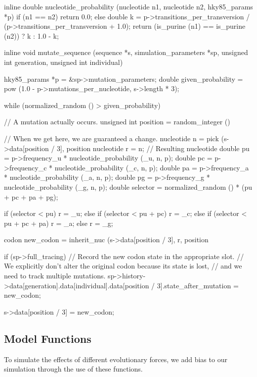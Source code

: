 \documentclass{article}
\begin{document}
\begin{ccode}
inline double nucleotide_probability (nucleotide n1, nucleotide n2, hky85_params *p) {
  if (n1 == n2)
    return 0.0;
  else {
    double k = p->transitions_per_transversion /
	       (p->transitions_per_transversion + 1.0);
    return (is_purine (n1) == is_purine (n2)) ? k : 1.0 - k;
  }
}

inline void mutate_sequence (sequence *s, simulation_parameters *sp,
			     unsigned int generation, unsigned int individual) {
  hky85_params *p = &sp->mutation_parameters;
  double given_probability = pow (1.0 - p->mutations_per_nucleotide, s->length * 3);

  while (normalized_random () > given_probability) {
    // A mutation actually occurs.
    unsigned int position = random_integer () %

    // When we get here, we are guaranteed a change.
    nucleotide n     = pick (s->data[position / 3], position %
    nucleotide r     = n; // Resulting nucleotide
    double pu        = p->frequency_u * nucleotide_probability (_u, n, p);
    double pc        = p->frequency_c * nucleotide_probability (_c, n, p);
    double pa        = p->frequency_a * nucleotide_probability (_a, n, p);
    double pg        = p->frequency_g * nucleotide_probability (_g, n, p);
    double selector  = normalized_random () * (pu + pc + pa + pg);

    if (selector < pu)        	 	r = _u;
    else if (selector < pu + pc)	r = _c;
    else if (selector < pu + pc + pa)	r = _a;
    else				r = _g;

    codon new_codon = inherit_nuc (s->data[position / 3], r, position %

    if (sp->full_tracing)
      // Record the new codon state in the appropriate slot.
      // We explicitly don’t alter the original codon because its state is lost,
      // and we need to track multiple mutations.
      sp->history->data[generation].data[individual].data[position / 3].state_after_mutation = new_codon;

    s->data[position / 3] = new_codon;
  }
}
\end{ccode}

    \subsection{Model Functions}

      To simulate the effects of different evolutionary forces, we add bias to
      our simulation through the use of these functions.
\end{document}
